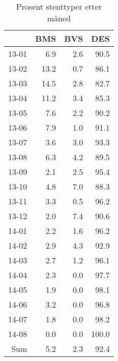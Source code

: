 \documentclass[presentation,xcolor=pdftex,dvipsnames,table]{beamer}
\begin{document}
\begin{frame}
\begin{tiny}
\begin{table}[ht]
\centering
\begin{tabular}{rrrr}
  \toprule
 & BMS & BVS & DES \\ 
  \midrule
13-01 & 6.9 & 2.6 & 90.5 \\ 
  13-02 & 13.2 & 0.7 & 86.1 \\ 
  13-03 & 14.5 & 2.8 & 82.7 \\ 
  13-04 & 11.2 & 3.4 & 85.3 \\ 
  13-05 & 7.6 & 2.2 & 90.2 \\ 
  13-06 & 7.9 & 1.0 & 91.1 \\ 
  13-07 & 3.6 & 3.0 & 93.3 \\ 
  13-08 & 6.3 & 4.2 & 89.5 \\ 
  13-09 & 2.1 & 2.5 & 95.4 \\ 
  13-10 & 4.8 & 7.0 & 88.3 \\ 
  13-11 & 3.3 & 0.5 & 96.2 \\ 
  13-12 & 2.0 & 7.4 & 90.6 \\ 
  14-01 & 2.2 & 1.6 & 96.2 \\ 
  14-02 & 2.9 & 4.3 & 92.9 \\ 
  14-03 & 2.7 & 1.2 & 96.1 \\ 
  14-04 & 2.3 & 0.0 & 97.7 \\ 
  14-05 & 1.9 & 0.0 & 98.1 \\ 
  14-06 & 3.2 & 0.0 & 96.8 \\ 
  14-07 & 1.8 & 0.0 & 98.2 \\ 
  14-08 & 0.0 & 0.0 & 100.0 \\ 
  Sum & 5.2 & 2.3 & 92.4 \\ 
   \bottomrule
\end{tabular}
\caption{Prosent stenttyper etter måned} 
\end{table}\end{tiny}
\end{frame}
\end{document}
